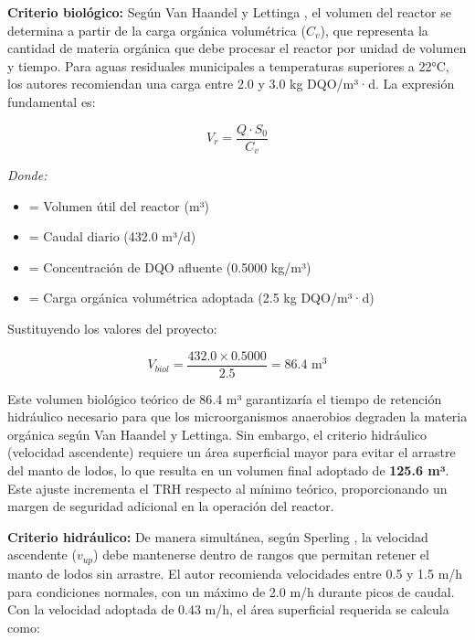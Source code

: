 \textbf{Criterio biológico:} Según Van Haandel y Lettinga \cite{vanhaandel1994}, el volumen del reactor se determina a partir de la carga orgánica volumétrica ($C_v$), que representa la cantidad de materia orgánica que debe procesar el reactor por unidad de volumen y tiempo. Para aguas residuales municipales a temperaturas superiores a 22°C, los autores recomiendan una carga entre 2.0 y 3.0 kg DQO/m³·d. La expresión fundamental es:

\begin{equation}
V_r = \frac{Q \cdot S_0}{C_v}
\end{equation}

\textit{Donde:}
\begin{itemize}[noitemsep,leftmargin=2em]
    \item[$V_r$] = Volumen útil del reactor (m³)
    \item[$Q$] = Caudal diario (432.0 m³/d)
    \item[$S_0$] = Concentración de DQO afluente (0.5000 kg/m³)
    \item[$C_v$] = Carga orgánica volumétrica adoptada (2.5 kg DQO/m³·d)
\end{itemize}

Sustituyendo los valores del proyecto:

\begin{equation}
V_{biol} = \frac{432.0 \times 0.5000}{2.5} = 86.4 \text{ m}^3
\end{equation}

Este volumen biológico teórico de 86.4 m³ garantizaría el tiempo de retención hidráulico necesario para que los microorganismos anaerobios degraden la materia orgánica según Van Haandel y Lettinga. Sin embargo, el criterio hidráulico (velocidad ascendente) requiere un área superficial mayor para evitar el arrastre del manto de lodos, lo que resulta en un volumen final adoptado de \textbf{125.6 m³}. Este ajuste incrementa el TRH respecto al mínimo teórico, proporcionando un margen de seguridad adicional en la operación del reactor.

\textbf{Criterio hidráulico:} De manera simultánea, según Sperling \cite{sperling2007}, la velocidad ascendente ($v_{up}$) debe mantenerse dentro de rangos que permitan retener el manto de lodos sin arrastre. El autor recomienda velocidades entre 0.5 y 1.5 m/h para condiciones normales, con un máximo de 2.0 m/h durante picos de caudal. Con la velocidad adoptada de 0.43 m/h, el área superficial requerida se calcula como:


